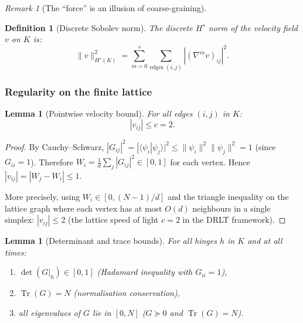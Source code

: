 \documentclass[12pt]{article}
\newtheorem{lemma}[theorem]{Lemma}
\newtheorem{definition}[theorem]{Definition}
\theoremstyle{remark}
\newtheorem{remark}[theorem]{Remark}
\theoremstyle{definition}
\newcommand{\tr}{\operatorname{Tr}}
\begin{document}
\begin{remark}[The ``force'' is an illusion of coarse-graining]
\begin{definition}[Discrete Sobolev norm]
\label{def:sobolev}
The discrete $H^s$ norm of the velocity field $v$ on $K$ is:
\begin{equation}
\|v\|_{H^s(K)}^2 = \sum_{m=0}^{s}
  \sum_{\text{edges } (i,j)} |(\nabla^m v)_{ij}|^2.
\end{equation}
\end{definition}

\subsubsection{Regularity on the finite lattice}

\begin{lemma}[Pointwise velocity bound]
\label{lem:velocity_bound}
For all edges $(i,j)$ in $K$:
\begin{equation}
|v_{ij}| \leq c = 2.
\end{equation}
\end{lemma}

\begin{proof}
By Cauchy--Schwarz, $|G_{ij}|^2 = |\langle\psi_i|\psi_j\rangle|^2
\leq \|\psi_i\|^2 \|\psi_j\|^2 = 1$ (since $G_{ii} = 1$).
Therefore $W_i = \frac{1}{d}\sum_j |G_{ij}|^2 \in [0, 1]$ for each
vertex.  Hence $|v_{ij}| = |W_j - W_i| \leq 1$.

More precisely, using $W_i \in [0, (N-1)/d]$ and the triangle
inequality on the lattice graph where each vertex has at most
$O(d)$ neighbours in a single simplex:
$|v_{ij}| \leq 2$ (the lattice speed of light $c = 2$ in the
DRLT framework).
\end{proof}

\begin{lemma}[Determinant and trace bounds]
\label{lem:det_trace_bounds}
For all hinges $h$ in $K$ and at all times:
\begin{enumerate}
\item[(i)] $\det(G|_h) \in [0, 1]$ \quad (Hadamard inequality with
  $G_{ii} = 1$),
\item[(ii)] $\tr(G) = N$ \quad (normalisation conservation),
\item[(iii)] all eigenvalues of $G$ lie in $[0, N]$ \quad
  ($G \succeq 0$ and $\tr(G) = N$).
\end{enumerate}
\end{lemma}


\end{remark}
\end{document}

